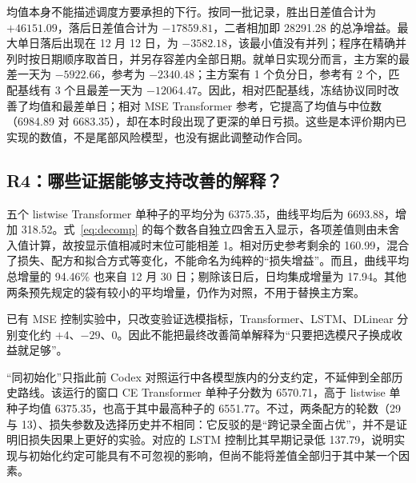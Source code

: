 \documentclass[11pt,a4paper]{article}
\begin{document}
均值本身不能描述调度方要承担的下行。按同一批记录，胜出日差值合计为 $+46151.09$，落后日差值合计为 $-17859.81$，二者相加即 28291.28 的总净增益。最大单日落后出现在 12 月 12 日，为 $-3582.18$，该最小值没有并列；程序在精确并列时按日期顺序取首日，并另存容差内全部日期。就单日实现分而言，主方案的最差一天为 $-5922.66$，参考为 $-2340.48$；主方案有 1 个负分日，参考有 2 个，匹配基线有 3 个且最差一天为 $-12064.47$。因此，相对匹配基线，冻结协议同时改善了均值和最差单日；相对 MSE Transformer 参考，它提高了均值与中位数（6984.89 对 6683.35），却在本时段出现了更深的单日亏损。这些是本评价期内已实现的数值，不是尾部风险模型，也没有据此调整动作合同。

\FloatBarrier
\subsection{R4：哪些证据能够支持改善的解释？}
\EqDecomposition

五个 listwise Transformer 单种子的平均分为 6375.35，曲线平均后为 6693.88，增加 318.52。式~\eqref{eq:decomp} 的每个数各自独立四舍五入显示，各项差值则由未舍入值计算，故按显示值相减时末位可能相差 1。相对历史参考剩余的 160.99，混合了损失、配方和拟合方式等变化，不能命名为纯粹的“损失增益”。而且，曲线平均总增量的 94.46\% 也来自 12 月 30 日；剔除该日后，日均集成增量为 17.94。其他两条预先规定的袋有较小的平均增量，仍作为对照，不用于替换主方案。


已有 MSE 控制实验中，只改变验证选模指标，Transformer、LSTM、DLinear 分别变化约 $+4$、$-29$、$0$。因此不能把最终改善简单解释为“只要把选模尺子换成收益就足够”。

“同初始化”只指此前 Codex 对照运行中各模型族内的分支约定，不延伸到全部历史路线。该运行的窗口 CE Transformer 单种子分数为 6570.71，高于 listwise 单种子均值 6375.35，也高于其中最高种子的 6551.77。不过，两条配方的轮数（29 与 13）、损失参数及选择历史并不相同：它反驳的是“跨记录全面占优”，并不是证明旧损失因果上更好的实验。对应的 LSTM 控制比其早期记录低 137.79，说明实现与初始化约定可能具有不可忽视的影响，但尚不能将差值全部归于其中某一个因素。
\FloatBarrier
\end{document}
